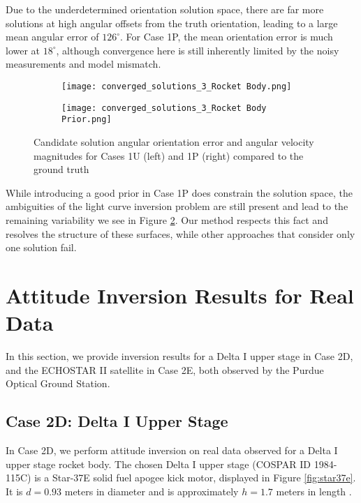 \documentclass[a4paper,twocolumn]{spaceDebrisC} %
\begin{document}
Due to the underdetermined orientation solution space, there are far more solutions at high angular offsets from the truth orientation, leading to a large mean angular error of $126^\circ$. For Case 1P, the mean orientation error is much lower at $18^\circ$, although convergence here is still inherently limited by the noisy measurements and model mismatch.

\begin{figure}[H]
  \centering
  \begin{subfigure}[t]{0.23\textwidth}
    \centering
    \texttt{[image: converged\_solutions\_3\_Rocket Body.png]}
    \caption{}
    \label{fig:w_vs_ang_error_sols1U}
  \end{subfigure}
  \hfill
  \begin{subfigure}[t]{0.23\textwidth}
    \centering
    \texttt{[image: converged\_solutions\_3\_Rocket Body Prior.png]}
    \caption{}
    \label{fig:w_vs_ang_error_sols1P}
  \end{subfigure}

  \caption{Candidate solution angular orientation error and angular velocity magnitudes for Cases 1U (left) and 1P (right) compared to the ground truth}
  \label{fig:w_vs_ang_error_sols1}
\end{figure}

While introducing a good prior in Case 1P does constrain the solution space, the ambiguities of the light curve inversion problem are still present and lead to the remaining variability we see in Figure \ref{fig:w_vs_ang_error_sols1P}. Our method respects this fact and resolves the structure of these surfaces, while other approaches that consider only one solution fail.

\section{Attitude Inversion Results for Real Data} \label{sec:real_results}

In this section, we provide inversion results for a Delta I upper stage in Case 2D, and the ECHOSTAR II satellite in Case 2E, both observed by the Purdue Optical Ground Station.

\subsection{Case 2D: Delta I Upper Stage}

In Case 2D, we perform attitude inversion on real data observed for a Delta I upper stage rocket body. The chosen Delta I upper stage (COSPAR ID 1984-115C) is a Star-37E \cite{delta3914_astronautix} solid fuel apogee kick motor, displayed in Figure \ref{fig:star37e}. It is $d=0.93$ meters in diameter and is approximately $h=1.7$ meters in length \cite{star37e_astronautix, star37_gunter}.
\end{document}
